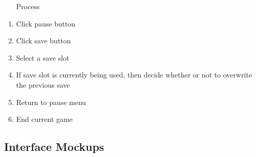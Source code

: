 \documentclass[10pt,conference,onecolumn,compsoc]{IEEEtran}
\begin{document}
\begin{itemize}
\begin{itemize}
\item [Process]
\end{itemize}
\begin{enumerate}
\item Click pause button
\item Click save button
\item Select a save slot
\item If save slot is currently being used, then decide whether or not to overwrite the previous save
\item Return to pause menu
\item End current game

\end{enumerate}

\end{itemize}
\subsection{Interface Mockups}
\end{document}

